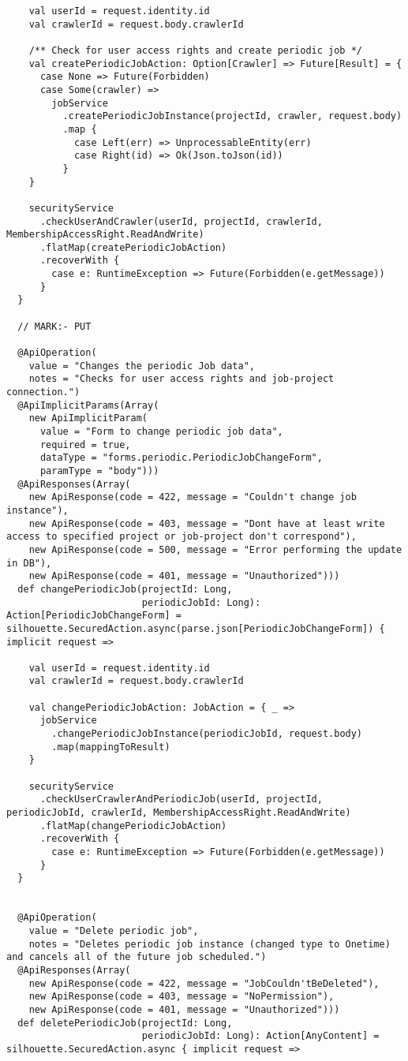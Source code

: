 \begin{lstlisting}
    val userId = request.identity.id
    val crawlerId = request.body.crawlerId

    /** Check for user access rights and create periodic job */
    val createPeriodicJobAction: Option[Crawler] => Future[Result] = {
      case None => Future(Forbidden)
      case Some(crawler) =>
        jobService
          .createPeriodicJobInstance(projectId, crawler, request.body)
          .map {
            case Left(err) => UnprocessableEntity(err)
            case Right(id) => Ok(Json.toJson(id))
          }
    }

    securityService
      .checkUserAndCrawler(userId, projectId, crawlerId, MembershipAccessRight.ReadAndWrite)
      .flatMap(createPeriodicJobAction)
      .recoverWith {
        case e: RuntimeException => Future(Forbidden(e.getMessage))
      }
  }

  // MARK:- PUT

  @ApiOperation(
    value = "Changes the periodic Job data",
    notes = "Checks for user access rights and job-project connection.")
  @ApiImplicitParams(Array(
    new ApiImplicitParam(
      value = "Form to change periodic job data",
      required = true,
      dataType = "forms.periodic.PeriodicJobChangeForm",
      paramType = "body")))
  @ApiResponses(Array(
    new ApiResponse(code = 422, message = "Couldn't change job instance"),
    new ApiResponse(code = 403, message = "Dont have at least write access to specified project or job-project don't correspond"),
    new ApiResponse(code = 500, message = "Error performing the update in DB"),
    new ApiResponse(code = 401, message = "Unauthorized")))
  def changePeriodicJob(projectId: Long,
                        periodicJobId: Long): Action[PeriodicJobChangeForm] = silhouette.SecuredAction.async(parse.json[PeriodicJobChangeForm]) { implicit request =>

    val userId = request.identity.id
    val crawlerId = request.body.crawlerId

    val changePeriodicJobAction: JobAction = { _ =>
      jobService
        .changePeriodicJobInstance(periodicJobId, request.body)
        .map(mappingToResult)
    }

    securityService
      .checkUserCrawlerAndPeriodicJob(userId, projectId, periodicJobId, crawlerId, MembershipAccessRight.ReadAndWrite)
      .flatMap(changePeriodicJobAction)
      .recoverWith {
        case e: RuntimeException => Future(Forbidden(e.getMessage))
      }
  }


  @ApiOperation(
    value = "Delete periodic job",
    notes = "Deletes periodic job instance (changed type to Onetime) and cancels all of the future job scheduled.")
  @ApiResponses(Array(
    new ApiResponse(code = 422, message = "JobCouldn'tBeDeleted"),
    new ApiResponse(code = 403, message = "NoPermission"),
    new ApiResponse(code = 401, message = "Unauthorized")))
  def deletePeriodicJob(projectId: Long,
                        periodicJobId: Long): Action[AnyContent] = silhouette.SecuredAction.async { implicit request =>


\end{lstlisting}
